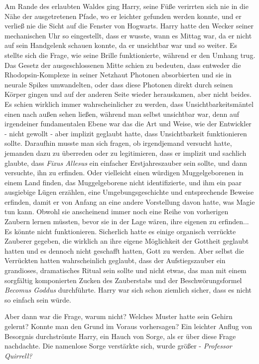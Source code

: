 Am Rande des erlaubten Waldes ging Harry, seine Füße verirrten sich nie in die
Nähe der ausgetretenen Pfade, wo er leichter gefunden werden konnte, und er
verließ nie die Sicht auf die Fenster von Hogwarts. Harry hatte den Wecker
seiner mechanischen Uhr so eingestellt, dass er wusste, wann es Mittag war, da
er nicht auf sein Handgelenk schauen konnte, da er unsichtbar war und so weiter.
Es stellte sich die Frage, wie seine Brille funktionierte, während er den Umhang
trug. Das Gesetz der ausgeschlossenen Mitte schien zu bedeuten, dass entweder
die Rhodopsin-Komplexe in seiner Netzhaut Photonen absorbierten und sie in
neurale Spikes umwandelten, oder dass diese Photonen direkt durch seinen Körper
gingen und auf der anderen Seite wieder herauskamen, aber nicht beides. Es
schien wirklich immer wahrscheinlicher zu werden, dass Unsichtbarkeitsmäntel
einen nach außen sehen ließen, während man selbst unsichtbar war, denn auf
irgendeiner fundamentalen Ebene war das die Art und Weise, wie der Entwickler -
nicht gewollt - aber implizit geglaubt hatte, dass Unsichtbarkeit funktionieren
sollte. Daraufhin musste man sich fragen, ob irgendjemand versucht hatte,
jemanden dazu zu überreden oder zu legitimieren, dass er implizit und sachlich
glaubte, dass \emph{Fixus Allesus} ein einfacher Erstjahreszauber sein sollte,
und dann versuchte, ihn zu erfinden. Oder vielleicht einen würdigen
Muggelgeborenen in einem Land finden, das Muggelgeborene nicht identifizierte,
und ihm ein paar ausgiebige Lügen erzählen, eine Umgebungsgeschichte und
entsprechende Beweise erfinden, damit er von Anfang an eine andere Vorstellung
davon hatte, was Magie tun kann. Obwohl sie anscheinend immer noch eine Reihe
von vorherigen Zaubern lernen müssten, bevor sie in der Lage wären, ihre eigenen
zu erfinden... Es könnte nicht funktionieren. Sicherlich hatte es einige
organisch verrückte Zauberer gegeben, die wirklich an ihre eigene Möglichkeit
der Gottheit geglaubt hatten und es dennoch nicht geschafft hatten, Gott zu
werden. Aber selbst die Verrückten hatten wahrscheinlich geglaubt, dass der
Aufstiegszauber ein grandioses, dramatisches Ritual sein sollte und nicht etwas,
das man mit einem sorgfältig komponierten Zucken des Zauberstabs und der
Beschwörungsformel \emph{Becomus Goddus} durchführte. Harry war sich schon
ziemlich sicher, dass es nicht so einfach sein würde.

Aber dann war die Frage, warum nicht? Welches Muster hatte sein Gehirn gelernt?
Konnte man den Grund im Voraus vorhersagen? Ein leichter Anflug von Besorgnis
durchströmte Harry, ein Hauch von Sorge, als er über diese Frage nachdachte. Die
namenlose Sorge verstärkte sich, wurde größer - \emph{Professor Quirrell?}

